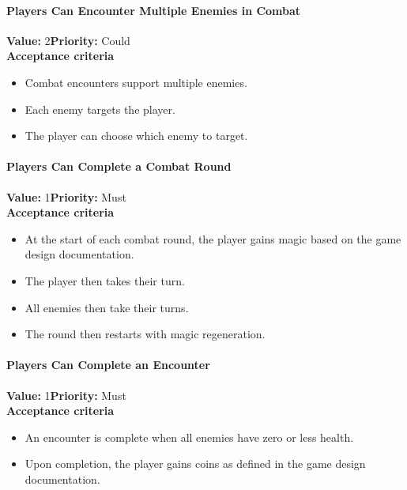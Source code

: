 \paragraph{Players Can Encounter Multiple Enemies in Combat}
\textbf{Value:} 2\quad \textbf{Priority:} Could\\
\textbf{Acceptance criteria}
\begin{itemize}
  \item Combat encounters support multiple enemies.
  \item Each enemy targets the player.
  \item The player can choose which enemy to target.
\end{itemize}

\paragraph{Players Can Complete a Combat Round}
\textbf{Value:} 1\quad \textbf{Priority:} Must\\
\textbf{Acceptance criteria}
\begin{itemize}
  \item At the start of each combat round, the player gains magic based on the game design documentation.
  \item The player then takes their turn.
  \item All enemies then take their turns.
  \item The round then restarts with magic regeneration.
\end{itemize}

\paragraph{Players Can Complete an Encounter}
\textbf{Value:} 1\quad \textbf{Priority:} Must\\
\textbf{Acceptance criteria}
\begin{itemize}
  \item An encounter is complete when all enemies have zero or less health.
  \item Upon completion, the player gains coins as defined in the game design documentation.
\end{itemize}

